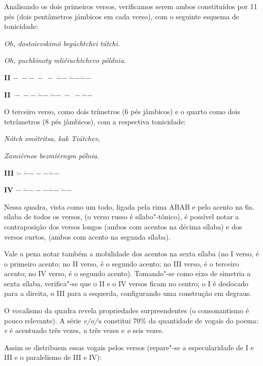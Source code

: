 Analisando os dois primeiros versos, verificamos serem ambos
constituídos por 11 pés (dois pentâmetros jámbicos em cada verso), com o
seguinte esquema de tonicidade:

\emph{Oh, dostoievskimó begúchtchei tútchi.}

\emph{Oh, puchkinoty mliéiuchtchevo póldnia}.

\textbf{II}
\(\mathbf{- \  - - \  - \  - \ }\acute{\mathbf{-}}\mathbf{- \ }\acute{\mathbf{-}}\mathbf{-}\acute{\mathbf{-}}\mathbf{-}\)

\textbf{II~}\(\mathbf{- \  - - \ }\acute{\mathbf{-}}\mathbf{- \ }\acute{\mathbf{-}}\mathbf{- \  - \  -}\acute{\mathbf{-}}\mathbf{-}\)

O terceiro verso, como dois trímetros (6 pés jâmbicos) e o quarto como
dois tetrâmetros (8 pés jâmbicos), com a respectiva tonicidade:

\emph{Nótch smótritsa, kak Tiútchev,}

\emph{Zamiérnoe bezmiérnym pólnia.}

\textbf{III}
\(\acute{\mathbf{-}}\mathbf{\ }\acute{\mathbf{-}}\mathbf{- - -}\acute{\mathbf{-}}\mathbf{- \ }\)

\textbf{IV}
\(\mathbf{- \ }\acute{\mathbf{-}}\mathbf{- - -}\acute{\mathbf{-}}\mathbf{- \ }\acute{\mathbf{-}}\mathbf{- \ }\)\textbf{\\
}

Nessa quadra, vista como um todo, ligada pela rima ABAB e pelo acento na
6a. sílaba de todos os versos, (o verso russo é sílabo"-tônico), é
possível notar a contraposição dos versos longos (ambos com acentos na
décima sílaba) e dos versos curtos, (ambos com acento na segunda
sílaba).

Vale a pena notar também a mobilidade dos acentos na sexta sílaba (no I
verso, é o primeiro acento; no II verso, é o segundo acento; no III
verso, é o terceiro acento; no IV verso, é o segundo acento). Tomando"-se
como eixo de simetria a sexta sílaba, verifica"-se que o II e o IV versos
ficam no centro; o I é deslocado para a direita, o III para a esquerda,
configurando uma construção em degraus.

O vocalismo da quadra revela propriedades surpreendentes (o
consonantismo é pouco relevante). A série \emph{e/o/u} constitui 70\% da
quantidade de vogais do poema: \emph{e} é acentuado três vezes, \emph{u}
três vezes e \emph{o} seis vezes.

Assim se distribuem essas vogais pelos versos (repare"-se a
especularidade de I e III e o paralelismo de III e IV):

